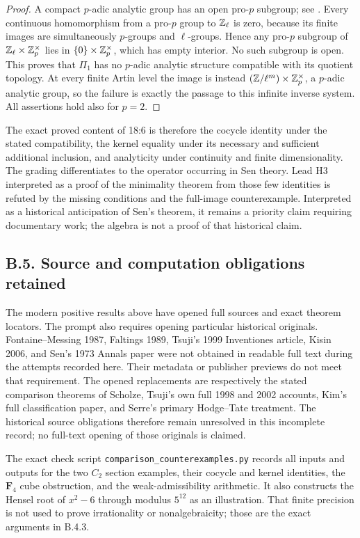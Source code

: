 \begin{proof}
A compact $p$-adic analytic group has an open pro-$p$ subgroup;
see \cite[Theorem 8.32 and Corollary 8.34, pp.200--201]{AuditDDMS1999}.
Every continuous homomorphism from a pro-$p$ group to
$\mathbb Z_\ell$ is zero, because its finite images are simultaneously
$p$-groups and $\ell$-groups. Hence any pro-$p$ subgroup of
$\mathbb Z_\ell\times\mathbb Z_p^\times$ lies in
$\{0\}\times\mathbb Z_p^\times$, which has empty interior.
No such subgroup is open. This proves that $\Pi_1$ has no
$p$-adic analytic structure compatible with its quotient
topology. At every finite Artin level the image is instead
$(\mathbb Z/\ell^m)\times\mathbb Z_p^\times$, a $p$-adic analytic group,
so the failure is exactly the passage to this infinite inverse
system. All assertions hold also for $p=2$.
\end{proof}

The exact proved content of 18:6 is therefore the cocycle
identity under the stated compatibility, the kernel equality
under its necessary and sufficient additional inclusion,
and analyticity under continuity and finite dimensionality.
The grading differentiates to the operator occurring in Sen
theory. Lead H3 interpreted as a proof of the minimality
theorem from those few identities is refuted by the missing
conditions and the full-image counterexample. Interpreted as
a historical anticipation of Sen's theorem, it remains a
priority claim requiring documentary work; the algebra is
not a proof of that historical claim.

\subsection{B.5. Source and computation obligations retained}

The modern positive results above have opened full sources
and exact theorem locators. The prompt also requires opening
particular historical originals. Fontaine--Messing 1987,
Faltings 1989, Tsuji's 1999 Inventiones article, Kisin 2006,
and Sen's 1973 Annals paper were not obtained in readable
full text during the attempts recorded here. Their metadata
or publisher previews do not meet that requirement. The
opened replacements are respectively the stated comparison
theorems of Scholze, Tsuji's own full 1998 and 2002 accounts,
Kim's full classification paper, and Serre's primary
Hodge--Tate treatment. The historical source obligations
therefore remain unresolved in this incomplete record;
no full-text opening of those originals is claimed.

The exact check script
\texttt{comparison\_counterexamples.py} records all inputs
and outputs for the two $C_2$ section examples, their
cocycle and kernel identities, the $\mathbf F_4$ cube
obstruction, and the weak-admissibility arithmetic.
It also constructs the Hensel root of $x^2-6$ through
modulus $5^{12}$ as an illustration. That finite precision
is not used to prove irrationality or nonalgebraicity;
those are the exact arguments in B.4.3.

